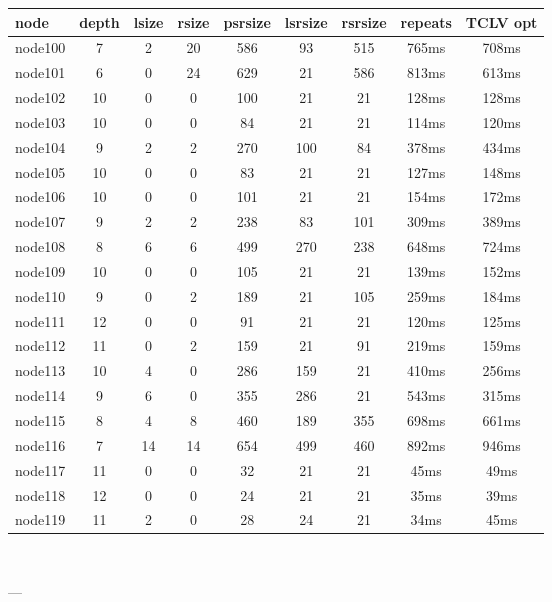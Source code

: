 \begin{tabular}{|l|c|c|c|c|c|c|c|c|}
\hline node & depth & lsize & rsize & psrsize & lsrsize & rsrsize   & repeats & TCLV opt\\
    \hline node100 & 7 & 2 & 20 & 586 & 93 & 515 & 765ms & 708ms\\
    \hline node101 & 6 & 0 & 24 & 629 & 21 & 586 & 813ms & 613ms\\
    \hline node102 & 10 & 0 & 0 & 100 & 21 & 21 & 128ms & 128ms\\
    \hline node103 & 10 & 0 & 0 & 84 & 21 & 21 & 114ms & 120ms\\
    \hline node104 & 9 & 2 & 2 & 270 & 100 & 84 & 378ms & 434ms\\
    \hline node105 & 10 & 0 & 0 & 83 & 21 & 21 & 127ms & 148ms\\
    \hline node106 & 10 & 0 & 0 & 101 & 21 & 21 & 154ms & 172ms\\
    \hline node107 & 9 & 2 & 2 & 238 & 83 & 101 & 309ms & 389ms\\
    \hline node108 & 8 & 6 & 6 & 499 & 270 & 238 & 648ms & 724ms\\
    \hline node109 & 10 & 0 & 0 & 105 & 21 & 21 & 139ms & 152ms\\
    \hline node110 & 9 & 0 & 2 & 189 & 21 & 105 & 259ms & 184ms\\
    \hline node111 & 12 & 0 & 0 & 91 & 21 & 21 & 120ms & 125ms\\
    \hline node112 & 11 & 0 & 2 & 159 & 21 & 91 & 219ms & 159ms\\
    \hline node113 & 10 & 4 & 0 & 286 & 159 & 21 & 410ms & 256ms\\
    \hline node114 & 9 & 6 & 0 & 355 & 286 & 21 & 543ms & 315ms\\
    \hline node115 & 8 & 4 & 8 & 460 & 189 & 355 & 698ms & 661ms\\
    \hline node116 & 7 & 14 & 14 & 654 & 499 & 460 & 892ms & 946ms\\
    \hline node117 & 11 & 0 & 0 & 32 & 21 & 21 & 45ms & 49ms\\
    \hline node118 & 12 & 0 & 0 & 24 & 21 & 21 & 35ms & 39ms\\
    \hline node119 & 11 & 2 & 0 & 28 & 24 & 21 & 34ms & 45ms\\

\hline
\end{tabular} \

---


